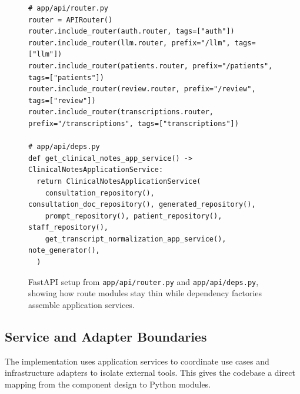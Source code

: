 \begin{figure}[htbp]
\centering
\begin{minipage}{0.92\textwidth}
\begin{verbatim}
# app/api/router.py
router = APIRouter()
router.include_router(auth.router, tags=["auth"])
router.include_router(llm.router, prefix="/llm", tags=["llm"])
router.include_router(patients.router, prefix="/patients", tags=["patients"])
router.include_router(review.router, prefix="/review", tags=["review"])
router.include_router(transcriptions.router, prefix="/transcriptions", tags=["transcriptions"])

# app/api/deps.py
def get_clinical_notes_app_service() -> ClinicalNotesApplicationService:
  return ClinicalNotesApplicationService(
    consultation_repository(), consultation_doc_repository(), generated_repository(),
    prompt_repository(), patient_repository(), staff_repository(),
    get_transcript_normalization_app_service(), note_generator(),
  )
\end{verbatim}
\end{minipage}
\caption{FastAPI setup from \texttt{app/api/router.py} and \texttt{app/api/deps.py}, showing how route modules stay thin while dependency factories assemble application services.}
\label{fig:implementation-fastapi-setup}
\end{figure}
\FloatBarrier

\subsection{Service and Adapter Boundaries}
\label{subsec:service-adapter-boundaries}

The implementation uses application services to coordinate use cases and infrastructure adapters to isolate external tools. This gives the codebase a direct mapping from the component design to Python modules.

